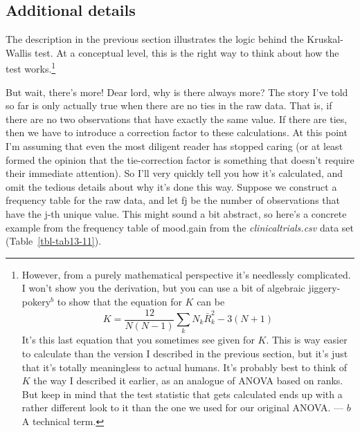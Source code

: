 \documentclass[
  a4paper,
]{book}
\begin{document}
\hypertarget{additional-details}{%
\subsection{Additional details}\label{additional-details}}

The description in the previous section illustrates the logic behind the
Kruskal-Wallis test. At a conceptual level, this is the right way to
think about how the test works.\footnote{However, from a purely
  mathematical perspective it's needlessly complicated. I won't show you
  the derivation, but you can use a bit of algebraic
  jiggery-pokery\(^b\) to show that the equation for \(K\) can be
  \[K=\frac{12}{N(N-1)}\sum_k N_k \bar{R}_k^2 -3(N+1)\] It's this last
  equation that you sometimes see given for \(K\). This is way easier to
  calculate than the version I described in the previous section, but
  it's just that it's totally meaningless to actual humans. It's
  probably best to think of \(K\) the way I described it earlier, as an
  analogue of ANOVA based on ranks. But keep in mind that the test
  statistic that gets calculated ends up with a rather different look to
  it than the one we used for our original ANOVA. --- \(b\) A technical
  term.}

But wait, there's more! Dear lord, why is there always more? The story
I've told so far is only actually true when there are no ties in the raw
data. That is, if there are no two observations that have exactly the
same value. If there are ties, then we have to introduce a correction
factor to these calculations. At this point I'm assuming that even the
most diligent reader has stopped caring (or at least formed the opinion
that the tie-correction factor is something that doesn't require their
immediate attention). So I'll very quickly tell you how it's calculated,
and omit the tedious details about why it's done this way. Suppose we
construct a frequency table for the raw data, and let fj be the number
of observations that have the j-th unique value. This might sound a bit
abstract, so here's a concrete example from the frequency table of
mood.gain from the \emph{clinicaltrials.csv} data set
(Table~\ref{tbl-tab13-11}).

\hypertarget{tbl-tab13-11}{}
 
  \providecommand{\huxb}[2]{\arrayrulecolor[RGB]{#1}\global\arrayrulewidth=#2pt}
  \providecommand{\huxvb}[2]{\color[RGB]{#1}\vrule width #2pt}
  \providecommand{\huxtpad}[1]{\rule{0pt}{#1}}
  \providecommand{\huxbpad}[1]{\rule[-#1]{0pt}{#1}}
\end{document}
